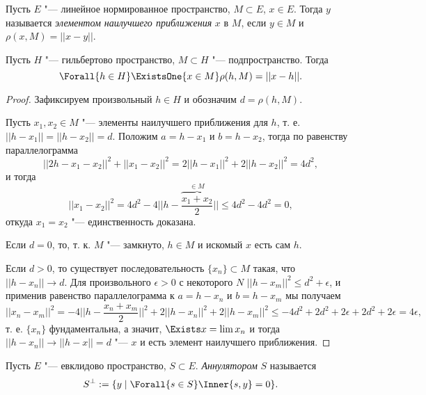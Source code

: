 \documentclass[main]{subfiles}
\begin{document}
\begin{definition}
  Пусть \( E \) "--- линейное нормированное пространство,
  \( M \subset E \),
  \( x \in E \). Тогда \( y \) называется 
  \emph{элементом наилучшего приближения}
  \( x \) в \( M \), если
  \( y \in M \) и \( \rho(x, M) = ||x - y|| \).
\end{definition}

\begin{lemma}
  Пусть \( H \) "--- гильбертово пространство, \( M \subset H \) "---
  подпространство. Тогда
  \[ \Forall{h \in H} \ExistsOne{x \in M} \rho(h, M) = ||x - h||. \]
\end{lemma}
\begin{proof}
  Зафиксируем произвольный \( h \in H \) и обозначим \( d = \rho(h, M) \).

  Пусть \( x_1, x_2 \in M \) "---
  элементы наилучшего приближения для \( h \),
  т. е.  \( ||h - x_1|| = ||h - x_2|| = d \).
  Положим \( a = h - x_1 \) и \( b = h - x_2 \),
  тогда по равенству параллелограмма
  \[ ||2h - x_1 - x_2||^2 + ||x_1 - x_2||^2 =
  2||h - x_1||^2 + 2 ||h - x_2||^2 = 4 d^2, \]
  и тогда
  \[ ||x_1 - x_2||^2 = 4d^2 - 4 ||h - \overbrace{\frac{x_1 + x_2}{2}}^{\in M}||
  \le 4d^2 - 4d^2 = 0, \]
  откуда \( x_1 = x_2 \) "--- единственность доказана.

  Если \( d = 0 \), то, т. к. \( M \) "--- замкнуто,
  \( h \in M \) и искомый \( x \) есть сам \( h \).

  Если \( d > 0 \), то существует последовательность
  \( \{ x_n \} \subset M \) такая, что
  \( ||h - x_n|| \to d \).  Для произвольного \( \epsilon > 0 \)
  с некоторого \( N \) \( ||h - x_m||^2 \le d^2 + \epsilon \),
  и применив равенство параллелограмма
  к \( a = h - x_n \) и \( b = h - x_m \) мы получаем
  \[
    ||x_n - x_m||^2 = -4 ||h - \frac{x_n + x_m}{2}||^2
    + 2 ||h - x_n||^2 + 2||h - x_m||^2 \le
    -4 d^2 + 2d^2 + 2\epsilon + 2d^2 + 2\epsilon =
    4 \epsilon,
  \]
  т. е. \( \{ x_n \} \) фундаментальна, а значит,
  \( \Exists x = \lim x_n \) и тогда
  \( ||h - x_n|| \to ||h - x|| = d \) "---
  \( x \) и есть элемент наилучшего приближения.
\end{proof}


\begin{definition}
  Пусть \( E \) "--- евклидово пространство, \( S \subset E \).
  \emph{Аннулятором} \( S \) называется
  \[ S^\perp := \{ y \mid \Forall{s \in S} \Inner{s, y} = 0 \}. \]
\end{definition}
\end{document}
